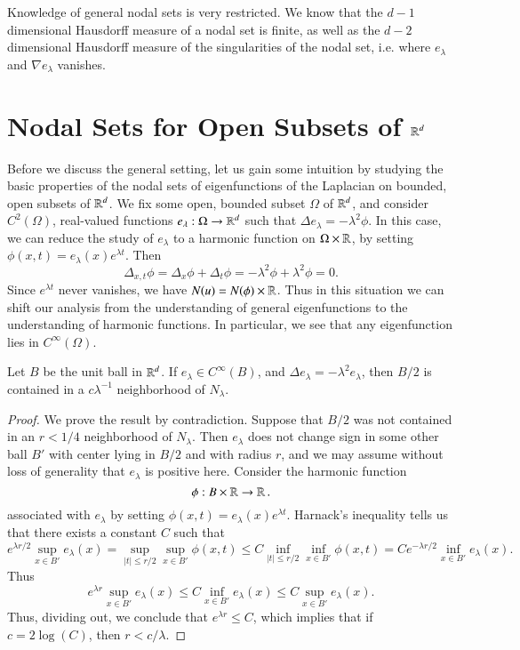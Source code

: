 Knowledge of general nodal sets is very restricted. We know that the $d-1$ dimensional Hausdorff measure of a nodal set is finite, as well as the $d-2$ dimensional Hausdorff measure of the singularities of the nodal set, i.e. where $e_\lambda$ and $\nabla e_\lambda$ vanishes.

\section{Nodal Sets for Open Subsets of $\operatorname{\mathbb{R}}^d$}

Before we discuss the general setting, let us gain some intuition by studying the basic properties of the nodal sets of eigenfunctions of the Laplacian on bounded, open subsets of $\operatorname{\mathbb{R}}^d$. We fix some open, bounded subset $\Omega$ of $\operatorname{\mathbb{R}}^d$, and consider $C^2(\Omega)$, real-valued functions $e_\lambda: \Omega \to \operatorname{\mathbb{R}}^d$ such that $\Delta e_\lambda = - \lambda^2 \phi$. In this case, we can reduce the study of $e_\lambda$ to a harmonic function on $\Omega \times \operatorname{\mathbb{R}}$, by setting $\phi(x,t) = e_\lambda(x) e^{\lambda t}$. Then
%
\[ \Delta_{x,t} \phi = \Delta_x \phi + \Delta_t \phi = - \lambda^2 \phi + \lambda^2 \phi = 0. \]
%
Since $e^{\lambda t}$ never vanishes, we have $N(u) = N(\phi) \times \operatorname{\mathbb{R}}$. Thus in this situation we can shift our analysis from the understanding of general eigenfunctions to the understanding of harmonic functions. In particular, we see that any eigenfunction lies in $C^\infty(\Omega)$.

\begin{theorem}
    Let $B$ be the unit ball in $\operatorname{\mathbb{R}}^d$. If $e_\lambda \in C^\infty(B)$, and $\Delta e_\lambda = - \lambda^2 e_\lambda$, then $B/2$ is contained in a $c \lambda^{-1}$ neighborhood of $N_\lambda$.
\end{theorem}
\begin{proof}
    We prove the result by contradiction. Suppose that $B/2$ was not contained in an $r < 1/4$ neighborhood of $N_\lambda$. Then $e_\lambda$ does not change sign in some other ball $B'$ with center lying in $B/2$ and with radius $r$, and we may assume without loss of generality that $e_\lambda$ is positive here. Consider the harmonic function
    \[ \phi: B \times \operatorname{\mathbb{R}} \to \operatorname{\mathbb{R}}. \]
    associated with $e_\lambda$ by setting $\phi(x,t) = e_\lambda(x) e^{\lambda t}$. Harnack's inequality tells us that there exists a constant $C$ such that
    \[ e^{\lambda r/2} \sup_{x \in B'} e_\lambda(x) = \sup_{|t| \leq r/2} \sup_{x \in B'} \phi(x,t) \leq C \inf_{|t| \leq r/2} \inf_{x \in B'} \phi(x,t) = C e^{-\lambda r/2} \inf_{x \in B'} e_\lambda(x). \]
    Thus
    \[ e^{\lambda r} \sup_{x \in B'} e_\lambda(x) \leq C \inf_{x \in B'} e_\lambda(x) \leq C \sup_{x \in B'} e_\lambda(x). \]
    Thus, dividing out, we conclude that $e^{\lambda r} \leq C$, which implies that if $c = 2\log(C)$, then $r < c/\lambda$.
\end{proof}

